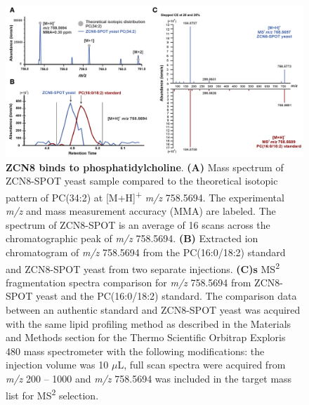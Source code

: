 \begin{figure}[t]
\begin{center}
\includegraphics[width=\linewidth]{Sup_Figures/Sup_Fig_14.png}
\caption[ZCN8 binds to phosphatidylcholine.]
{ \textbf{ZCN8 binds to phosphatidylcholine}.
\textbf{(A)} Mass spectrum of ZCN8-SPOT yeast sample compared to the theoretical isotopic pattern of PC(34:2) at [M+H]\textsuperscript{+} \textit{m/z} 758.5694. The experimental \textit{m/z} and mass measurement accuracy (MMA) are labeled. The spectrum of ZCN8-SPOT is an average of 16 scans across the chromatographic peak of \textit{m/z} 758.5694.  
\textbf{(B)} Extracted ion chromatogram of \textit{m/z} 758.5694 from the PC(16:0/18:2) standard and ZCN8-SPOT yeast from two separate injections.  
\textbf{(C)s} MS\textsuperscript{2} fragmentation spectra comparison for \textit{m/z} 758.5694 from ZCN8-SPOT yeast and the PC(16:0/18:2) standard.
The comparison data between an authentic standard and ZCN8-SPOT yeast was acquired with the same lipid profiling method as described in the Materials and Methods section for the Thermo Scientific Orbitrap Exploris 480 mass spectrometer with the following modifications:  the injection volume was 10 $\mu$L, full scan spectra were acquired from \textit{m/z} 200 – 1000 and \textit{m/z} 758.5694 was included in the target mass
list for MS\textsuperscript{2} selection.}
\label{figure:Sup:ZCN8-PC}
\end{center}
\end{figure}


